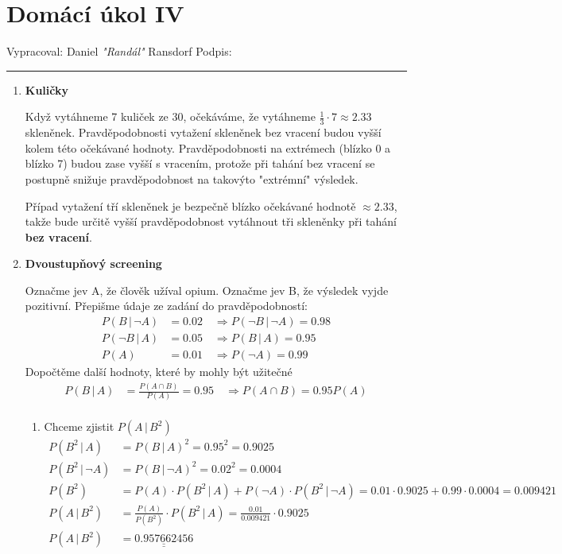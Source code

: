 \documentclass[12pt]{article}
\begin{document}
\section*{Domácí úkol IV}

Vypracoval: Daniel \textit{"Randál"} Ransdorf \hfill Podpis: \rule{4cm}{0.4pt}

\begin{enumerate}
  \item \textbf{Kuličky}

    Když vytáhneme 7 kuliček ze 30, očekáváme, že vytáhneme $\frac{1}{3}\cdot7 \approx 2.33$ skleněnek.
    Pravděpodobnosti vytažení skleněnek bez vracení budou vyšší kolem této očekávané hodnoty.
    Pravděpodobnosti na extrémech (blízko 0 a blízko 7) budou zase vyšší s vracením,
    protože při tahání bez vracení se postupně snižuje pravděpodobnost
    na takovýto "extrémní" výsledek.

    Případ vytažení tří skleněnek je bezpečně blízko očekávané hodnotě $\approx 2.33$,
    takže bude určitě vyšší pravděpodobnost vytáhnout tři skleněnky při tahání \textbf{bez vracení}.

  \item \textbf{Dvoustupňový screening}

    Označme jev A, že člověk užíval opium. Označme jev B, že výsledek vyjde pozitivní.
    Přepišme údaje ze zadání do pravděpodobností:
    \begin{align*}
      P(B \,|\, \neg A) &= 0.02 \quad \Rightarrow P(\neg B \,|\, \neg A) = 0.98 \\
      P(\neg B \,|\, A) &= 0.05 \quad \Rightarrow P(B \,|\, A) = 0.95 \\
      P(A) &= 0.01 \quad \Rightarrow P(\neg A) = 0.99
    \end{align*}
    Dopočtěme další hodnoty, které by mohly být užitečné
    \begin{align*}
      P(B \,|\, A) &= \frac{P(A \cap B)}{P(A)} = 0.95 \quad \Rightarrow P(A \cap B) = 0.95P(A) \\
    \end{align*}

    \begin{enumerate}
      \item Chceme zjistit $P(A \,|\, B^2)$
        \begin{align*}
          P(B^2 \,|\, A) &= P(B \,|\, A)^2 = 0.95^2 = 0.9025 \\
          P(B^2 \,|\, \neg A) &= P(B \,|\, \neg A)^2 = 0.02^2 = 0.0004 \\
          P(B^2) &= P(A) \cdot P(B^2 \,|\, A) + P(\neg A) \cdot P(B^2 \,|\, \neg A) = 0.01\cdot0.9025 + 0.99\cdot0.0004 = 0.009421 \\
          P(A \,|\, B^2) &= \frac{P(A)}{P(B^2)} \cdot P(B^2 \,|\, A) = \frac{0.01}{0.009421} \cdot 0.9025 \\
          P(A \,|\, B^2) &= \underline{\underline{0.957662456}}
        \end{align*}
      

\end{enumerate}
\end{enumerate}
\end{document}
